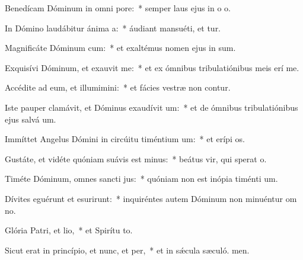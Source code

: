 \item Benedícam Dóminum in omni pore:~* semper laus ejus in o o.
\item In Dómino laudábitur ánima a:~* áudiant mansuéti, et tur.
\item Magnificáte Dóminum cum:~* et exaltémus nomen ejus in sum.
\item Exquisívi Dóminum, et exauvit me:~* et ex ómnibus tribulatiónibus meis erí me.
\item Accédite ad eum, et illumimini:~* et fácies vestræ non contur.
\item Iste pauper clamávit, et Dóminus exaudívit um:~* et de ómnibus tribulatiónibus ejus salvá um.
\item Immíttet Angelus Dómini in circúitu timéntium um:~* et erípi os.
\item Gustáte, et vidéte quóniam suávis est minus:~* beátus vir, qui sperat  o.
\item Timéte Dóminum, omnes sancti jus:~* quóniam non est inópia timénti um.
\item Dívites eguérunt et esurirunt:~* inquiréntes autem Dóminum non minuéntur om no.
\item Glória Patri, et lio,~* et Spirítu to.
\item Sicut erat in princípio, et nunc, et per,~* et in sǽcula sæculó. men.
